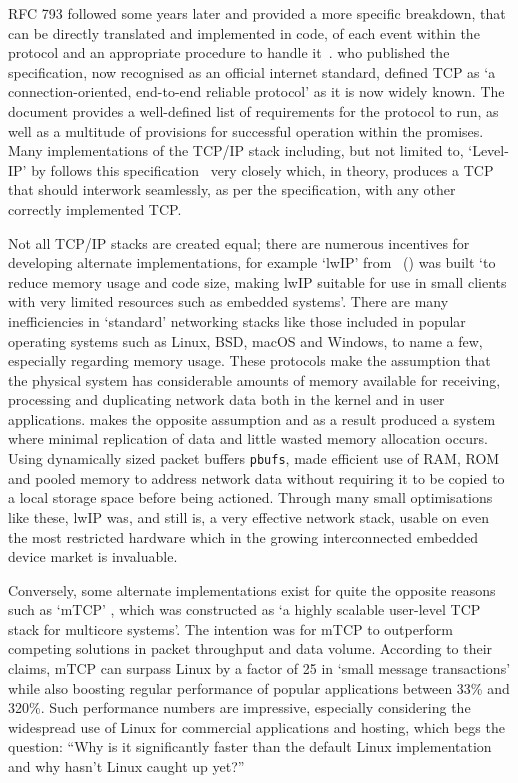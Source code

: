 \documentclass[11pt,a4paper,british]{bhamarticle}
\begin{document}
\begin{multicols}{2}
RFC 793 followed some years later and provided a more specific breakdown, that can be directly translated and implemented in code, of each event within the protocol and an appropriate procedure to handle it~\cite[Page~54-77]{rfc793}. \citeauthor{rfc793} who published the specification, now recognised as an official internet standard, defined TCP as `a connection-oriented, end-to-end reliable protocol' as it is now widely known. The document provides a well-defined list of requirements for the protocol to run, as well as a multitude of provisions for successful operation within the promises.
Many implementations of the TCP/IP stack including, but not limited to, `Level-IP' by \citeauthor{levelip-spec} follows this specification~\cite[\texttt{src/tcp\_input.c} line~262]{levelip-spec} very closely which, in theory, produces a TCP that should interwork seamlessly, as per the specification, with any other correctly implemented TCP. %

Not all TCP/IP stacks are created equal; there are numerous incentives for developing alternate implementations, for example `lwIP' from \citeauthor{lwip}~(\citeyear{lwip}) was built `to reduce memory usage and code size, making lwIP suitable for use in small clients with very limited resources such as embedded systems'. There are many inefficiencies in `standard' networking stacks like those included in popular operating systems such as Linux, BSD, macOS and Windows, to name a few, especially regarding memory usage. These protocols make the assumption that the physical system has considerable amounts of memory available for receiving, processing and duplicating network data both in the kernel and in user applications. \citeauthor{lwip} makes the opposite assumption and as a result produced a system where minimal replication of data and little wasted memory allocation occurs. Using dynamically sized packet buffers \texttt{pbufs}, \citeauthor{lwip} made efficient use of RAM, ROM and pooled memory to address network data without requiring it to be copied to a local storage space before being actioned. Through many small optimisations like these, lwIP was, and still is, a very effective network stack, usable on even the most restricted hardware which in the growing interconnected embedded device market is invaluable.

Conversely, some alternate implementations exist for quite the opposite reasons such as `mTCP' \citeauthor{jeong2014mtcp}, which was constructed as `a highly scalable user-level TCP stack for multicore systems'. The intention was for mTCP to outperform competing solutions in packet throughput and data volume. According to their claims, mTCP can surpass Linux by a factor of 25 in `small message transactions' while also boosting regular performance of popular applications between 33\% and 320\%. Such performance numbers are impressive, especially considering the widespread use of Linux for commercial applications and hosting, which begs the question: ``Why is it significantly faster than the default Linux implementation and why hasn't Linux caught up yet?''~\cite[2.2, 3]{jeong2014mtcp}


\end{multicols}
\end{document}
